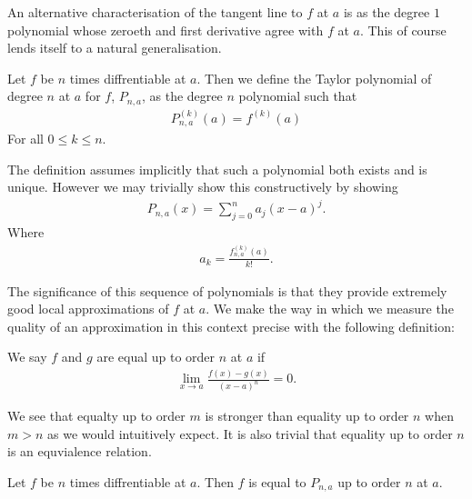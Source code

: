 \documentclass[]{article}
\begin{document}
An alternative characterisation of the tangent line to $f$ at $a$ is as the degree $1$ polynomial whose zeroeth and first derivative agree with $f$ at $a$. This of course lends itself to a natural generalisation.

\begin{defi} 
		Let $f$ be $n$ times diffrentiable at $a$. Then we define the Taylor polynomial of degree $n$ at $a$ for $f$, $P_{n,a}$, as the degree $n$ polynomial such that
	\begin{align*}
			P_{n,a}^{(k)}(a) = f^{(k)}(a)
	\end{align*}
	For all $0 \leq k \leq n$.
\end{defi}

The definition assumes implicitly that such a polynomial both exists and is unique. However we may trivially show this constructively by showing 
\begin{align*}
		P_{n,a}(x) = \sum_{j=0}^n a_j (x-a)^j.
\end{align*}
Where 
\begin{align*}
		a_k = \frac{f_{n,a}^{(k)}(a)}{k!}.
\end{align*}

The significance of this sequence of polynomials is that they provide extremely good local approximations of $f$ at $a$. We make the way in which we measure the quality of an approximation in this context precise with the following definition:

\begin{defi} 
	We say $f$ and $g$ are equal up to order $n$ at $a$ if 
	\begin{align*}
			\lim_{x\to a} \frac{f(x) - g(x)}{(x-a)^n} = 0.
	\end{align*}
\end{defi}

We see that equalty up to order $m$ is stronger than equality up to order $n$ when $m > n$ as we would intuitively expect. It is also trivial that equality up to order $n$ is an equvialence relation.

\begin{thm}
		Let $f $ be $n$ times diffrentiable at $a$. Then $f$ is equal to $P_{n,a}$ up to order $n$ at $a$.		
\end{thm}
\end{document}

